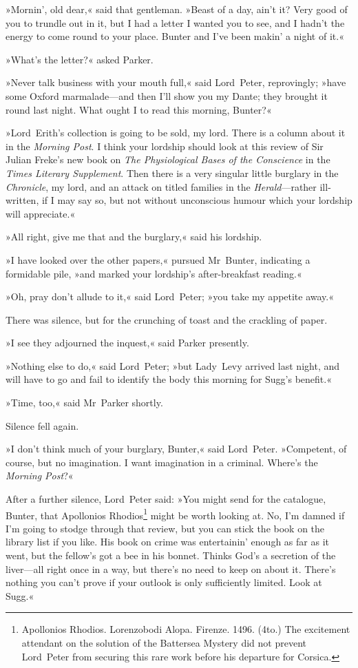 »Mornin', old dear,« said that gentleman. »Beast of a day, ain't it? Very good of you to trundle out in it, but I had a letter I wanted you to see, and I hadn't the energy to come round to your place. Bunter and I've been makin' a night of it.«

»What's the letter?« asked Parker.

»Never talk business with your mouth full,« said Lord~Peter, reprovingly; »have some Oxford marmalade—and then I'll show you my Dante; they brought it round last night. What ought I to read this morning, Bunter?«

»Lord~Erith's collection is going to be sold, my lord. There is a column about it in the \textit{Morning Post}. I think your lordship should look at this review of Sir Julian Freke's new book on \textit{The Physiological Bases of the Conscience} in the \textit{Times Literary Supplement}. Then there is a very singular little burglary in the \textit{Chronicle}, my lord, and an attack on titled families in the \textit{Herald}---rather ill-written, if I may say so, but not without unconscious humour which your lordship will appreciate.«

»All right, give me that and the burglary,« said his lordship.

»I have looked over the other papers,« pursued Mr~Bunter, indicating a formidable pile, »and marked your lordship's after-breakfast reading.«

»Oh, pray don't allude to it,« said Lord~Peter; »you take my appetite away.«

There was silence, but for the crunching of toast and the crackling of paper.

»I see they adjourned the inquest,« said Parker presently.

»Nothing else to do,« said Lord~Peter; »but Lady~Levy arrived last night, and will have to go and fail to identify the body this morning for Sugg's benefit.«

»Time, too,« said Mr~Parker shortly.

Silence fell again.

»I don't think much of your burglary, Bunter,« said Lord~Peter. »Competent, of course, but no imagination. I want imagination in a criminal. Where's the \textit{Morning Post}?«

After a further silence, Lord~Peter said: »You might send for the catalogue, Bunter, that Apollonios Rhodios\footnote{Apollonios Rhodios. Lorenzobodi Alopa. Firenze. 1496. (4to.) The excitement attendant on the solution of the Battersea Mystery did not prevent Lord~Peter from securing this rare work before his departure for Corsica.} might be worth looking at. No, I'm damned if I'm going to stodge through that review, but you can stick the book on the library list if you like. His book on crime was entertainin' enough as far as it went, but the fellow's got a bee in his bonnet. Thinks God's a secretion of the liver—all right once in a way, but there's no need to keep on about it. There's nothing you can't prove if your outlook is only sufficiently limited. Look at Sugg.«

